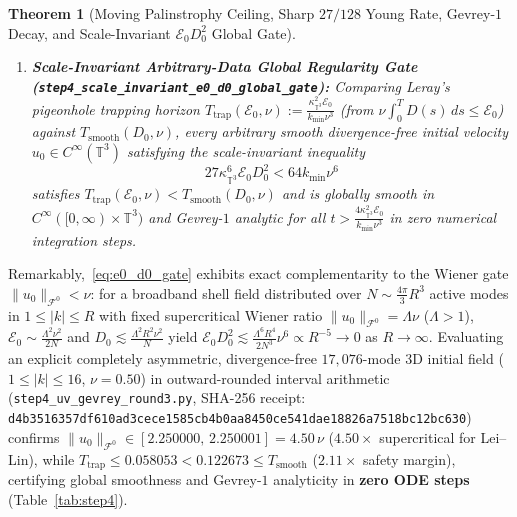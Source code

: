 \documentclass[11pt]{article}
\theoremstyle{plain}
\newtheorem{theorem}{Theorem}[section]
\theoremstyle{definition}
\begin{document}
\begin{theorem}[Moving Palinstrophy Ceiling, Sharp $27/128$ Young Rate, Gevrey-$1$ Decay, and Scale-Invariant $\mathcal{E}_0 D_0^2$ Global Gate]
\begin{enumerate}
  \item \textbf{Scale-Invariant Arbitrary-Data Global Regularity Gate (\texttt{step4\_scale\_invariant\_\allowbreak e0\_d0\_global\_gate}):} Comparing Leray's pigeonhole trapping horizon $T_{\mathrm{trap}}(\mathcal{E}_0,\nu) := \frac{\kappa_{\mathbb{T}^3}^2 \mathcal{E}_0}{k_{\min}\nu^3}$ (from $\nu \int_0^T D(s)\,ds \le \mathcal{E}_0$) against $T_{\mathrm{smooth}}(D_0,\nu)$, \emph{every} arbitrary smooth divergence-free initial velocity $u_0 \in C^\infty(\mathbb{T}^3)$ satisfying the scale-invariant inequality
  \begin{equation}\label{eq:e0_d0_gate}
    27 \kappa_{\mathbb{T}^3}^6 \mathcal{E}_0 D_0^2 < 64 k_{\min} \nu^6
  \end{equation}
  satisfies $T_{\mathrm{trap}}(\mathcal{E}_0,\nu) < T_{\mathrm{smooth}}(D_0,\nu)$ and is globally smooth in $C^\infty([0,\infty)\times\mathbb{T}^3)$ and Gevrey-$1$ analytic for all $t > \frac{4\kappa_{\mathbb{T}^3}^2 \mathcal{E}_0}{k_{\min}\nu^3}$ in zero numerical integration steps.
\end{enumerate}
\end{theorem}

Remarkably,~\eqref{eq:e0_d0_gate} exhibits exact complementarity to the Wiener gate $\|u_0\|_{\mathcal{F}^0} < \nu$: for a broadband shell field distributed over $N \sim \frac{4\pi}{3} R^3$ active modes in $1 \le |k| \le R$ with fixed supercritical Wiener ratio $\|u_0\|_{\mathcal{F}^0} = \Lambda\nu$ ($\Lambda > 1$), $\mathcal{E}_0 \sim \frac{\Lambda^2\nu^2}{2N}$ and $D_0 \lesssim \frac{\Lambda^2 R^2 \nu^2}{N}$ yield $\mathcal{E}_0 D_0^2 \lesssim \frac{\Lambda^6 R^4}{2 N^3}\nu^6 \propto R^{-5} \to 0$ as $R \to \infty$. Evaluating an explicit completely asymmetric, divergence-free $17{,}076$-mode 3D initial field ($1 \le |k| \le 16$, $\nu = 0.50$) in outward-rounded interval arithmetic (\texttt{step4\_uv\_gevrey\_round3.py}, SHA-256 receipt: \texttt{d4b3516357df610a\allowbreak d3cece1585cb4b0a\allowbreak a8450ce541dae188\allowbreak 26a7518bc12bc630}) confirms $\|u_0\|_{\mathcal{F}^0} \in [2.250000, \, 2.250001] = 4.50\,\nu$ ($4.50\times$ supercritical for Lei--Lin), while $T_{\mathrm{trap}} \le 0.058053 < 0.122673 \le T_{\mathrm{smooth}}$ ($2.11\times$ safety margin), certifying global smoothness and Gevrey-$1$ analyticity in \textbf{zero ODE steps} (Table~\ref{tab:step4}).
\end{document}
